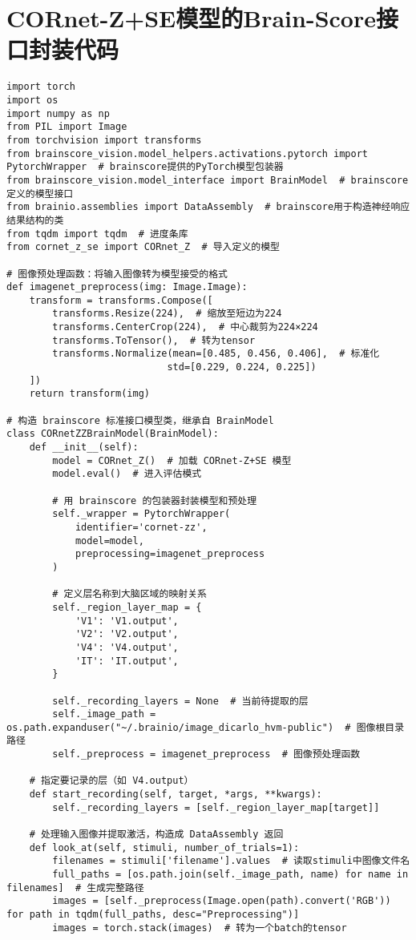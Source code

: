 \section{CORnet-Z+SE模型的Brain-Score接口封装代码}
\begin{lstlisting}
import torch
import os
import numpy as np
from PIL import Image
from torchvision import transforms
from brainscore_vision.model_helpers.activations.pytorch import PytorchWrapper  # brainscore提供的PyTorch模型包装器
from brainscore_vision.model_interface import BrainModel  # brainscore定义的模型接口
from brainio.assemblies import DataAssembly  # brainscore用于构造神经响应结果结构的类
from tqdm import tqdm  # 进度条库
from cornet_z_se import CORnet_Z  # 导入定义的模型

# 图像预处理函数：将输入图像转为模型接受的格式
def imagenet_preprocess(img: Image.Image):
    transform = transforms.Compose([
        transforms.Resize(224),  # 缩放至短边为224
        transforms.CenterCrop(224),  # 中心裁剪为224×224
        transforms.ToTensor(),  # 转为tensor
        transforms.Normalize(mean=[0.485, 0.456, 0.406],  # 标准化
                            std=[0.229, 0.224, 0.225])
    ])
    return transform(img)

# 构造 brainscore 标准接口模型类，继承自 BrainModel
class CORnetZZBrainModel(BrainModel):
    def __init__(self):
        model = CORnet_Z()  # 加载 CORnet-Z+SE 模型
        model.eval()  # 进入评估模式

        # 用 brainscore 的包装器封装模型和预处理
        self._wrapper = PytorchWrapper(
            identifier='cornet-zz',
            model=model,
            preprocessing=imagenet_preprocess
        )

        # 定义层名称到大脑区域的映射关系
        self._region_layer_map = {
	        'V1': 'V1.output',
	        'V2': 'V2.output',
        	'V4': 'V4.output',
        	'IT': 'IT.output',
        }

        self._recording_layers = None  # 当前待提取的层
        self._image_path = os.path.expanduser("~/.brainio/image_dicarlo_hvm-public")  # 图像根目录路径
        self._preprocess = imagenet_preprocess  # 图像预处理函数

    # 指定要记录的层（如 V4.output）
    def start_recording(self, target, *args, **kwargs):
        self._recording_layers = [self._region_layer_map[target]]

    # 处理输入图像并提取激活，构造成 DataAssembly 返回
    def look_at(self, stimuli, number_of_trials=1):
        filenames = stimuli['filename'].values  # 读取stimuli中图像文件名
        full_paths = [os.path.join(self._image_path, name) for name in filenames]  # 生成完整路径
        images = [self._preprocess(Image.open(path).convert('RGB')) for path in tqdm(full_paths, desc="Preprocessing")]
        images = torch.stack(images)  # 转为一个batch的tensor


\end{lstlisting}
